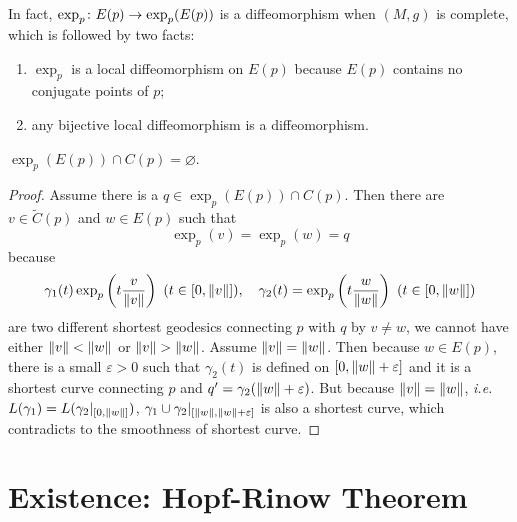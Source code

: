 \begin{rmk}
	In fact, $\exp_p \colon E(p) \rightarrow \exp_p(E(p))$ is a diffeomorphism when $(M,g)$ is complete, which is followed by two facts:
	\begin{enumerate}[label=(\roman{*})]
		\item $\exp_p$ is a local diffeomorphism on $E(p)$ because $E(p)$ contains no conjugate points of $p$;
		\item any bijective local diffeomorphism is a diffeomorphism.
	\end{enumerate}
\end{rmk}

\begin{cor}
	$\exp_p(E(p)) \cap C(p) = \varnothing$.
\end{cor}
\begin{proof}
	Assume there is a $q \in \exp_p(E(p)) \cap C(p)$. Then there are $v \in \tilde{C}(p)$ and $w \in E(p)$ such that
	\begin{equation*}
		\exp_p(v) = \exp_p(w) = q
	\end{equation*}
	because
	\begin{equation*}
		\gamma_1(t) \exp_p\left(t\frac{v}{\left\lVert v\right\lVert}\right)~(t \in [0,\left\lVert v\right\lVert]),\quad \gamma_2(t)= \exp_p\left(t\frac{w}{\left\lVert w\right\lVert}\right) ~(t \in [0,\left\lVert w\right\lVert])
	\end{equation*}
	 are two different shortest geodesics connecting $p$ with $q$ by $v \neq w$, we cannot have either $\left\lVert v\right\lVert < \left\lVert w\right\lVert$ or $\left\lVert v\right\lVert > \left\lVert w\right\lVert$. Assume $\left\lVert v\right\lVert = \left\lVert w\right\lVert$. Then because $w \in E(p)$, there is a small $\varepsilon > 0$ such that $\gamma_2(t)$ is defined on $[0,\left\lVert w\right\lVert+\varepsilon]$ and it is a shortest curve connecting $p$ and $q^\prime = \gamma_2(\left\lVert w\right\lVert+\varepsilon)$. But because $\left\lVert v\right\lVert = \left\lVert w\right\lVert$, \emph{i.e.} $L(\gamma_1) = L(\gamma_2|_{[0,\left\lVert w\right\lVert]})$, $\gamma_1 \cup \gamma_2|_{[\left\lVert w\right\lVert,\left\lVert w\right\lVert+\varepsilon]}$ is also a shortest curve, which contradicts to the smoothness of shortest curve.
\end{proof}

\section{Existence: Hopf-Rinow Theorem}

